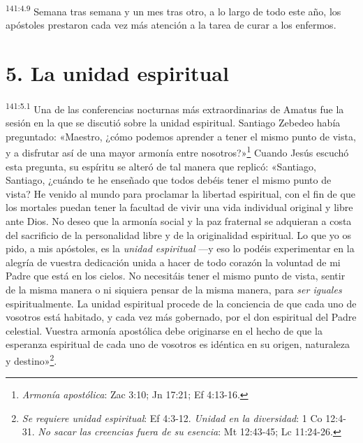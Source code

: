 \par 
\textsuperscript{141:4.9} Semana tras semana y un mes tras otro, a lo largo de todo este año, los apóstoles prestaron cada vez más atención a la tarea de curar a los enfermos.

\section*{5. La unidad espiritual}
\par 
\textsuperscript{141:5.1} Una de las conferencias nocturnas más extraordinarias de Amatus fue la sesión en la que se discutió sobre la unidad espiritual. Santiago Zebedeo había preguntado: «Maestro, ¿cómo podemos aprender a tener el mismo punto de vista, y a disfrutar así de una mayor armonía entre nosotros?»\footnote{\textit{Armonía apostólica}: Zac 3:10; Jn 17:21; Ef 4:13-16.} Cuando Jesús escuchó esta pregunta, su espíritu se alteró de tal manera que replicó: «Santiago, Santiago, ¿cuándo te he enseñado que todos debéis tener el mismo punto de vista? He venido al mundo para proclamar la libertad espiritual, con el fin de que los mortales puedan tener la facultad de vivir una vida individual original y libre ante Dios. No deseo que la armonía social y la paz fraternal se adquieran a costa del sacrificio de la personalidad libre y de la originalidad espiritual. Lo que yo os pido, a mis apóstoles, es la \textit{unidad espiritual} ---y eso lo podéis experimentar en la alegría de vuestra dedicación unida a hacer de todo corazón la voluntad de mi Padre que está en los cielos. No necesitáis tener el mismo punto de vista, sentir de la misma manera o ni siquiera pensar de la misma manera, para \textit{ser iguales} espiritualmente. La unidad espiritual procede de la conciencia de que cada uno de vosotros está habitado, y cada vez más gobernado, por el don espiritual del Padre celestial. Vuestra armonía apostólica debe originarse en el hecho de que la esperanza espiritual de cada uno de vosotros es idéntica en su origen, naturaleza y destino»\footnote{\textit{Se requiere unidad espiritual}: Ef 4:3-12. \textit{Unidad en la diversidad}: 1 Co 12:4-31. \textit{No sacar las creencias fuera de su esencia}: Mt 12:43-45; Lc 11:24-26.}.

